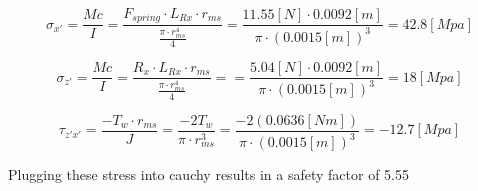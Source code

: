 \documentclass[../main.tex]{subfiles}
\begin{document}
\begin{equation*} 
\sigma_{x'} =\frac{Mc}{I}=\frac{F_{spring}\cdot{}L_{Rx}\cdot{}r_{ms}}{\frac{\pi\cdot{}r_{ms}^4}{4}} = \frac{11.55[N]\cdot{0.0092[m]}}{\pi\cdot{(0.0015[m])}^3} = 42.8[Mpa]
\end{equation*}

\begin{equation*} 
\sigma_{z'}=\frac{Mc}{I}=\frac{R_{x}\cdot{}L_{Rx}\cdot{}r_{ms}}{\frac{\pi\cdot{}r_{ms}^4}{4}} == \frac{5.04[N]\cdot{0.0092[m]}}{\pi\cdot{(0.0015[m])}^3} = 18[Mpa]
\end{equation*}

\begin{equation*}
\tau_{z'x'} = \frac{-T_w\cdot{}r_{ms}}{J} = \frac{-2T_w}{\pi\cdot{}r_{ms}^3} = \frac{-2(0.0636[Nm])}{\pi\cdot{}(0.0015[m])^3} = -12.7[Mpa]
\end{equation*}

Plugging these stress into cauchy results in a safety factor of 5.55
\end{document}
